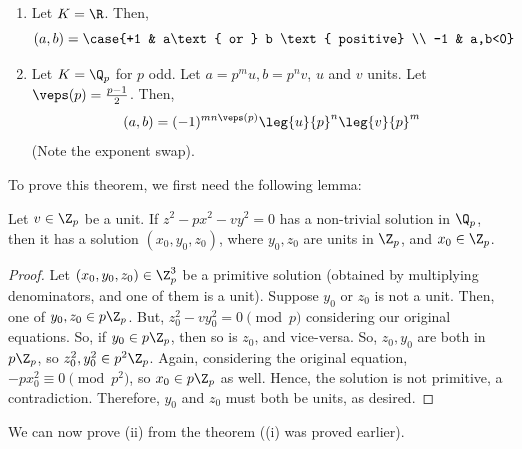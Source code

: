 \begin{thm}
    \begin{enumerate}
        \item[(i)] Let $K=\R$. Then,
        $$(a,b) = \case{+1 & a\text{ or } b \text{ positive} \\ -1 & a,b<0}$$
        \item[(ii)] Let $K=\Q_p$ for $p$ odd. Let $a = p^mu,b=p^nv$, $u$ and $v$ units. Let $\veps (p)=\frac{p-1}{2}$. Then,
        $$(a,b)=(-1)^{mn \veps (p)}\leg{u}{p}^n\leg{v}{p}^m$$
        (Note the exponent swap).
    \end{enumerate}
\end{thm}
To prove this theorem, we first need the following lemma:

\begin{lem}
    Let $v \in \Z_p$ be a unit. If $z^2-px^2-vy^2=0$ has a non-trivial solution in $\Q_p$, then it has a solution $(x_0,y_0,z_0)$, where $y_0,z_0$ are units in $\Z_p$, and $x_0 \in \Z_p$.
\end{lem}

\begin{proof}
    Let $(x_0,y_0,z_0) \in \Z_p^3$ be a primitive solution (obtained by multiplying denominators, and one of them is a unit). Suppose $y_0$ or $z_0$ is not a unit. Then, one of $y_0,z_0 \in p\Z_p$. But, $z_0^2-vy_0^2=0 \pmod p$ considering our original equations. So, if $y_0 \in p\Z_p$, then so is $z_0$, and vice-versa. So, $z_0,y_0$ are both in $p\Z_p$, so $z_0^2,y_0^2 \in p^2\Z_p$. Again, considering the original equation, $-px_0^2 \equiv 0 \pmod {p^2}$, so $x_0 \in p\Z_p$ as well. Hence, the solution is not primitive, a contradiction. Therefore, $y_0$ and $z_0$ must both be units, as desired.
\end{proof}

We can now prove (ii) from the theorem ((i) was proved earlier).

